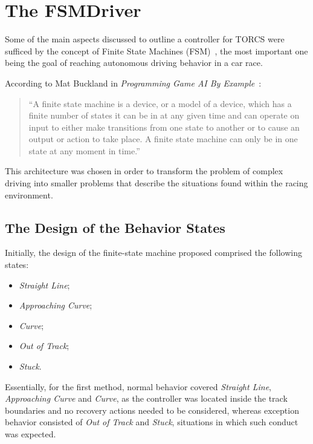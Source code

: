 \section{\textbf{The FSMDriver}} \label{sec:FSM}
	
	Some of the main aspects discussed to outline a controller for TORCS were sufficed by the concept of Finite State Machines (FSM)~\cite{Millington:2006:FSM}, the most important one being the goal of reaching autonomous driving behavior in a car race.

	According to Mat Buckland in \emph{Programming Game AI By Example}~\cite{Buckland:2005:AI}:
	
	\begin{quotation} \itshape
		
		``A finite state machine is a device, or a model of a device, which has a finite number of states it can be in at any given time and can operate on input to either make transitions from one state to another or to cause an output or action to take place. A finite state machine can only be in one state at any moment in time.''
		
	\end{quotation}
	
	This architecture was chosen in order to transform the problem of complex driving into smaller problems that describe the situations found within the racing environment.
	
\subsection{The Design of the Behavior States}
	
	Initially, the design of the finite-state machine proposed comprised the following states:
	
	\begin{itemize}

	\item \emph{Straight Line};
	
	\item \emph{Approaching Curve};
	
	\item \emph{Curve};
	
	\item \emph{Out of Track};
	
	\item \emph{Stuck}.

	\end{itemize}
	
	Essentially, for the first method, normal behavior covered \emph{Straight Line}, \emph{Approaching Curve} and \emph{Curve}, as the controller was located inside the track boundaries and no recovery actions needed to be considered, whereas exception behavior consisted of \emph{Out of Track} and \emph{Stuck}, situations in which such conduct was expected.
	

